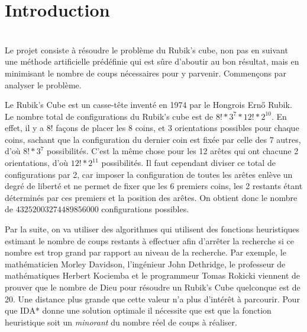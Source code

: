 \documentclass[fleqn,10pt,french]{SelfArx} %
\affiliation{*\textbf{Code source}: https://github.com/lyx-x/Rubik}
\begin{document}
\renewcommand{\proofname}{Preuve}

\flushbottom %

\maketitle %

\renewcommand{\contentsname}{Table des matières}
\tableofcontents %

\thispagestyle{empty} %


\section{Introduction} %

~\\\indent
Le projet consiste à résoudre le problème du Rubik's cube, non pas en suivant une méthode artificielle prédéfinie qui est sûre d'aboutir au bon résultat, mais en minimisant le nombre de coups nécessaires pour y parvenir. Commençons par analyser le problème.

Le Rubik’s Cube est un casse-tête inventé en 1974 par le Hongrois Ernő Rubik. Le nombre total de configurations du Rubik's cube est de $8! * 3^{7} * 12! * 2^{10}$. En effet, il y a 8! façons de placer les 8 coins, et 3 orientations possibles pour chaque coins, sachant que la configuration du dernier coin est fixée par celle des 7 autres, d'où $8! * 3^{7}$ possibilités. C'est la même chose pour les 12 arêtes qui ont chacune 2 orientations, d'où $12! * 2^{11}$ possibilités. Il faut cependant diviser ce total de configurations par 2, car imposer la configuration de toutes les arêtes enlève un degré de liberté et ne permet de fixer que les 6 premiers coins, les 2 restants étant déterminés par ces premiers et la position des arêtes. On obtient donc le nombre de $43252003274489856000$ configurations possibles.

Par la suite, on va utiliser des algorithmes qui utilisent des fonctions heuristiques estimant le nombre de coups restants à effectuer afin d'arrêter la recherche si ce nombre est trop grand par rapport au niveau de la recherche. Par exemple, le mathématicien Morley Davidson, l’ingénieur John Dethridge, le professeur de mathématiques Herbert Kociemba et le programmeur Tomas Rokicki viennent de prouver que le nombre de Dieu pour résoudre un Rubik’s Cube quelconque est de 20. Une distance plus grande que cette valeur n’a plus d’intérêt à parcourir. Pour que IDA* donne une solution optimale il nécessite que est que la fonction heuristique soit un \textit{minorant} du nombre réel de coups à réaliser. 
\end{document}
